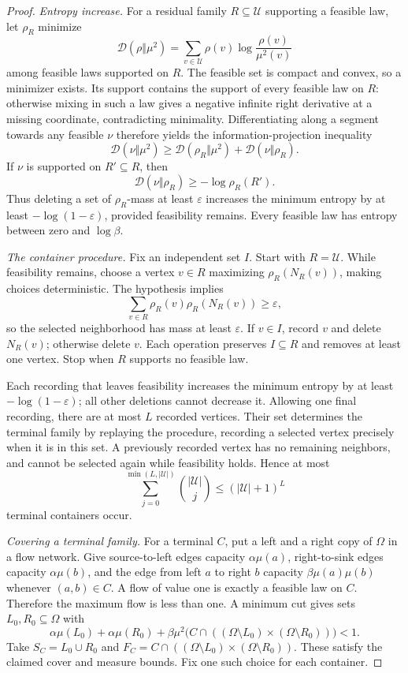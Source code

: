 \documentclass[11pt]{article}
\begin{document}
\begin{proof}
\emph{Entropy increase.}
For a residual family $R\subseteq\mathcal U$ supporting a feasible law, let $\rho_R$ minimize
\[
\mathcal D(\rho\Vert\mu^2)=\sum_{v\in\mathcal U}\rho(v)\log\frac{\rho(v)}{\mu^2(v)}
\]
among feasible laws supported on $R$. The feasible set is compact and convex, so a minimizer exists. Its support contains the support of every feasible law on $R$: otherwise mixing in such a law gives a negative infinite right derivative at a missing coordinate, contradicting minimality. Differentiating along a segment towards any feasible $\nu$ therefore yields the information-projection inequality
\[
\mathcal D(\nu\Vert\mu^2)\ge
\mathcal D(\rho_R\Vert\mu^2)+\mathcal D(\nu\Vert\rho_R).
\]
If $\nu$ is supported on $R'\subseteq R$, then
\[
\mathcal D(\nu\Vert\rho_R)\ge-\log\rho_R(R').
\]
Thus deleting a set of $\rho_R$-mass at least $\varepsilon$ increases the minimum entropy by at least $-\log(1-\varepsilon)$, provided feasibility remains. Every feasible law has entropy between zero and $\log\beta$.

\emph{The container procedure.}
Fix an independent set $I$. Start with $R=\mathcal U$. While feasibility remains, choose a vertex $v\in R$ maximizing $\rho_R(N_R(v))$, making choices deterministic. The hypothesis implies
\[
\sum_{v\in R}\rho_R(v)\rho_R(N_R(v))\ge\varepsilon,
\]
so the selected neighborhood has mass at least $\varepsilon$. If $v\in I$, record $v$ and delete $N_R(v)$; otherwise delete $v$. Each operation preserves $I\subseteq R$ and removes at least one vertex. Stop when $R$ supports no feasible law.

Each recording that leaves feasibility increases the minimum entropy by at least $-\log(1-\varepsilon)$; all other deletions cannot decrease it. Allowing one final recording, there are at most $L$ recorded vertices. Their set determines the terminal family by replaying the procedure, recording a selected vertex precisely when it is in this set. A previously recorded vertex has no remaining neighbors, and cannot be selected again while feasibility holds. Hence at most
\[
\sum_{j=0}^{\min(L,|\mathcal U|)}\binom{|\mathcal U|}{j}
\le(|\mathcal U|+1)^L
\]
terminal containers occur.

\emph{Covering a terminal family.}
For a terminal $C$, put a left and a right copy of $\Omega$ in a flow network. Give source-to-left edges capacity $\alpha\mu(a)$, right-to-sink edges capacity $\alpha\mu(b)$, and the edge from left $a$ to right $b$ capacity $\beta\mu(a)\mu(b)$ whenever $(a,b)\in C$. A flow of value one is exactly a feasible law on $C$. Therefore the maximum flow is less than one. A minimum cut gives sets $L_0,R_0\subseteq\Omega$ with
\[
\alpha\mu(L_0)+\alpha\mu(R_0)
+\beta\mu^2\bigl(C\cap((\Omega\setminus L_0)\times(\Omega\setminus R_0))\bigr)<1.
\]
Take $S_C=L_0\cup R_0$ and
$F_C=C\cap((\Omega\setminus L_0)\times(\Omega\setminus R_0))$.
These satisfy the claimed cover and measure bounds. Fix one such choice for each container.


\end{proof}
\end{document}
